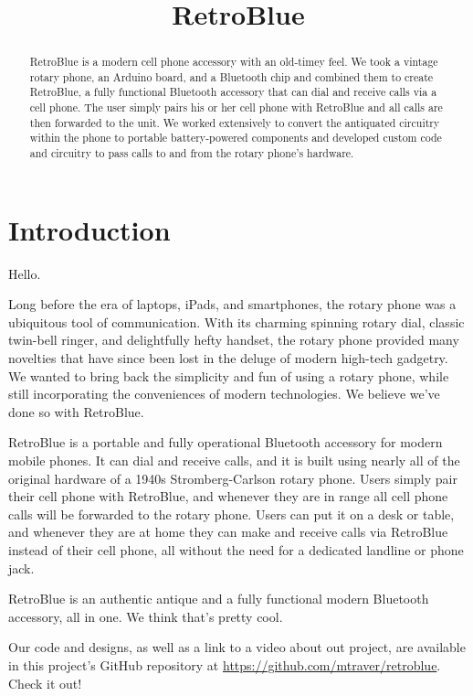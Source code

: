 \documentclass{es50report}
\title{RetroBlue}
\begin{document}
    \maketitlepage

    \begin{abstract}
        RetroBlue is a modern cell phone accessory with an old-timey feel. We took a vintage rotary phone, an Arduino board, and a Bluetooth chip and combined them to create RetroBlue, a fully functional Bluetooth accessory that can dial and receive calls via a cell phone. The user simply pairs his or her cell phone with RetroBlue and all calls are then forwarded to the unit. We worked extensively to convert the antiquated circuitry within the phone to portable battery-powered components and developed custom code and circuitry to pass calls to and from the rotary phone's hardware.
    \end{abstract}
    \newpage

    \section{Introduction}
    Hello.

    Long before the era of laptops, iPads, and smartphones, the rotary phone was a ubiquitous tool of communication. With its charming spinning rotary dial, classic twin-bell ringer, and delightfully hefty handset,  the rotary phone provided many novelties that have since been lost in the deluge of modern high-tech gadgetry. We wanted to bring back the simplicity and fun of using a rotary phone, while still incorporating the conveniences of modern technologies. We believe we've done so with RetroBlue.

    RetroBlue is a portable and fully operational Bluetooth accessory for modern mobile phones. It can dial and receive calls, and it is built using nearly all of the original hardware of a 1940s Stromberg-Carlson rotary phone. Users simply pair their cell phone with RetroBlue, and whenever they are in range all cell phone calls will be forwarded to the rotary phone. Users can put it on a desk or table, and whenever they are at home they can make and receive calls via RetroBlue instead of their cell phone, all without the need for a dedicated landline or phone jack.

    RetroBlue is an authentic antique and a fully functional modern Bluetooth accessory, all in one. We think that's pretty cool.

    Our code and designs, as well as a link to a video about out project, are available in this project's GitHub repository at \url{https://github.com/mtraver/retroblue}. Check it out!
\end{document}
